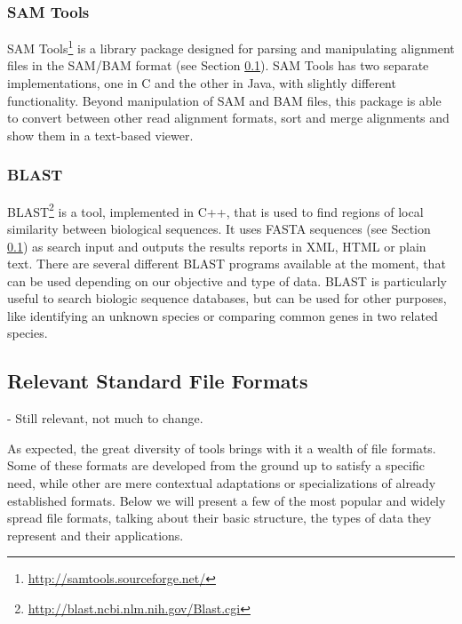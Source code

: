 \subsubsection*{SAM Tools}

SAM Tools\footnote{\url{http://samtools.sourceforge.net/}} is a library 
package designed for parsing and manipulating alignment files in the SAM/BAM
format \cite{Li2009} (see Section \ref{sec:formats}). SAM Tools has two separate
implementations, one in C and the other in Java, with slightly different
functionality. Beyond manipulation of SAM and BAM files, this package is able to
convert between other read alignment formats, sort and merge alignments and show
them in a text-based viewer.

\subsubsection*{BLAST}

BLAST\footnote{\url{http://blast.ncbi.nlm.nih.gov/Blast.cgi}} is a tool,
implemented in C++, that is used to find regions of local similarity between
biological sequences. It uses FASTA sequences (see Section \ref{sec:formats}) as
search input and outputs the results reports in XML, HTML or plain text. There
are several different BLAST programs available at the moment, that can be used
depending on our objective and type of data. BLAST is particularly useful to
search biologic sequence databases, but can be used for other purposes, like
identifying an unknown species or comparing common genes in two related
species.

\subsection{Relevant Standard File Formats}\label{sec:formats}

\begin{Notes}
- Still relevant, not much to change.\\
\end{Notes}

As expected, the great diversity of \rnaseq{} tools brings with it a wealth of
file formats. Some of these formats are developed from the ground up to satisfy
a specific need, while other are mere contextual adaptations or specializations
of already established formats. Below we will present a few of the most popular
and widely spread file formats, talking about their basic structure, the types
of data they represent and their applications.

